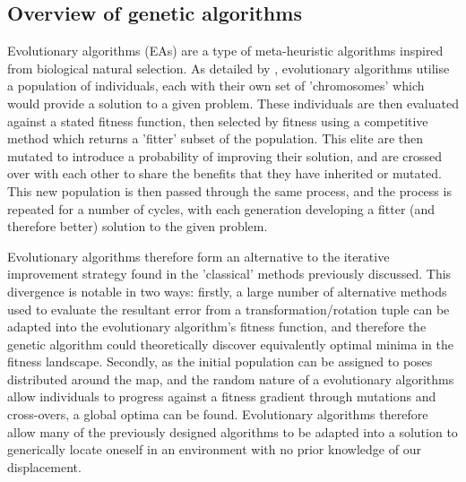\documentclass[authoryearcitations]{UoYCSproject}
\begin{document}
\subsection{Overview of genetic algorithms}
Evolutionary algorithms (EAs) are a type of meta-heuristic algorithms inspired from biological natural selection. As detailed by \citet{Whitley1994-tx}, evolutionary algorithms utilise a population of individuals, each with their own set of 'chromosomes' which would provide a solution to a given problem. These individuals are then evaluated against a stated fitness function, then selected by fitness using a competitive method which returns a 'fitter' subset of the population. This elite are then mutated to introduce a probability of improving their solution, and are crossed over with each other to share the benefits that they have inherited or mutated. This new population is then passed through the same process, and the process is repeated for a number of cycles, with each generation developing a fitter (and therefore better) solution to the given problem. 

Evolutionary algorithms therefore form an alternative to the iterative improvement strategy found in the 'classical' methods previously discussed. This divergence is notable in two ways: firstly, a large number of alternative methods used to evaluate the resultant error from a transformation/rotation tuple can be adapted into the evolutionary algorithm's fitness function, and therefore the genetic algorithm could theoretically discover equivalently optimal minima in the fitness landscape. Secondly, as the initial population can be assigned to poses distributed around the map, and the random nature of a evolutionary algorithms allow individuals to progress against a fitness gradient through mutations and cross-overs, a global optima can be found. Evolutionary algorithms therefore allow many of the previously designed algorithms to be adapted into a solution to generically locate oneself in an environment with no prior knowledge of our displacement.

\end{document}
